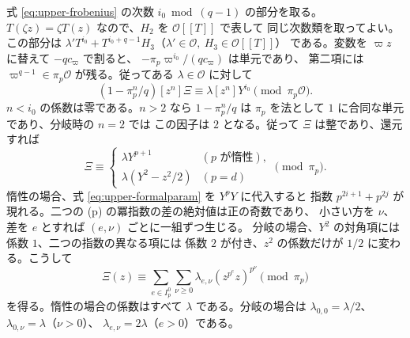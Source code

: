 式 \eqref{eq:upper-frobenius} の次数 \(i_0\bmod(q-1)\) の部分を取る。
\(T(\zeta z)=\zeta T(z)\) なので、\(H_2\) を \(\mathcal O[[T]]\) で表して
同じ次数類を取ってよい。この部分は
\(\lambda' T^{i_0}+T^{i_0+q-1}H_3\)（\(\lambda'\in\mathcal O,\ H_3\in\mathcal O[[T]]\)）
である。変数を \(\varpi z\) に替えて \(-q c_\varpi\) で割ると、
\(-\pi_p\varpi^{i_0}/(q c_\varpi)\) は単元であり、
第二項には \(\varpi^{q-1}\in\pi_p\mathcal O\) が残る。従ってある
\(\lambda\in\mathcal O\) に対して
\[
 (1-\pi_p^n/q)[z^n]\Xi\equiv\lambda[z^n]Y^{i_0}\pmod{\pi_p\mathcal O}.
\]
\(n<i_0\) の係数は零である。\(n>2\) なら \(1-\pi_p^n/q\) は
\(\pi_p\) を法として \(1\) に合同な単元であり、分岐時の \(n=2\) では
この因子は \(2\) となる。従って \(\Xi\) は整であり、還元すれば
\[
 \Xi\equiv
 \begin{cases}
    \lambda Y^{p+1}& (p\text{ が惰性}),\\
    \lambda(Y^2-z^2/2)& (p=d)
 \end{cases}
 \pmod{\pi_p}.
\]
惰性の場合、式 \eqref{eq:upper-formalparam} を \(Y^pY\) に代入すると
指数 \(p^{2i+1}+p^{2j}\) が現れる。二つの (p) の冪指数の差の絶対値は正の奇数であり、
小さい方を \(\nu\)、差を \(e\) とすれば \((e,\nu)\) ごとに一組ずつ生じる。
分岐の場合、\(Y^2\) の対角項には係数 \(1\)、二つの指数の異なる項には
係数 \(2\) が付き、\(z^2\) の係数だけが \(1/2\) に変わる。こうして
\[
  \Xi(z)\equiv
  \sum_{e\in I_p^0}\sum_{\nu\ge0}\lambda_{e,\nu}(z^{p^e}z)^{p^\nu}
  \pmod{\pi_p}
\]
を得る。惰性の場合の係数はすべて \(\lambda\) である。分岐の場合は
\(\lambda_{0,0}=\lambda/2\)、\(\lambda_{0,\nu}=\lambda\)（\(\nu>0\)）、
\(\lambda_{e,\nu}=2\lambda\)（\(e>0\)）である。

